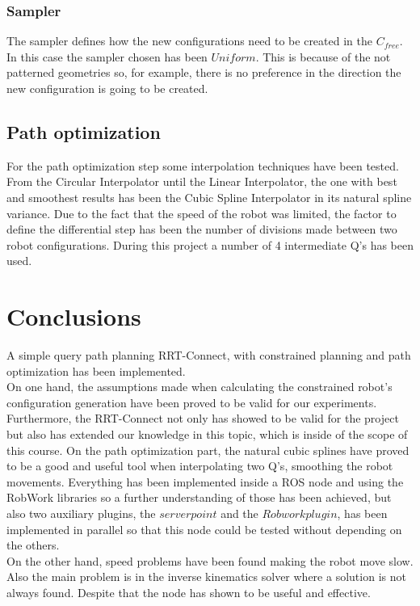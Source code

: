 	\subsubsection{Sampler} %
	\label{sub:sampler}
	The sampler defines how the new configurations need to be created in the $C_{free}$. In this case the sampler chosen has been $Uniform$. This is because of the not patterned geometries so, for example, there is no preference in the direction the new configuration is going to be created.
\subsection{Path optimization} %
\label{sub:path_optimization_implementation}
For the path optimization step some interpolation techniques have been tested. 
From the Circular Interpolator until the Linear Interpolator, the one with best and smoothest results has been the Cubic Spline Interpolator in its natural spline variance.
Due to the fact that the speed of the robot was limited, the factor to define the differential step has been the number of divisions made between two robot configurations. 
During this project a number of 4 intermediate Q's has been used.


\section{Conclusions} %
\label{sec:conclusions_pathplanning}
A simple query path planning RRT-Connect, with constrained planning and path optimization has been implemented. \\

On one hand, the assumptions made when calculating the constrained robot's configuration generation have been proved to be valid for our experiments. 
Furthermore, the RRT-Connect not only has showed to be valid for the project but also has extended our knowledge in this topic, which is inside of the scope of this course.
On the path optimization part, the natural cubic splines have proved to be a good and useful tool when interpolating two Q's, smoothing the robot movements. Everything has been implemented inside a ROS node and using the RobWork libraries so a further understanding of those has been achieved, but also two auxiliary plugins, the $server point$ and the $Robwork plugin$, has been implemented in parallel so that this node could be tested without depending on the others.\\

On the other hand, speed problems have been found making the robot move slow. Also the main problem is in the inverse kinematics solver where a solution is not always found. Despite that the node has shown to be useful and effective.


